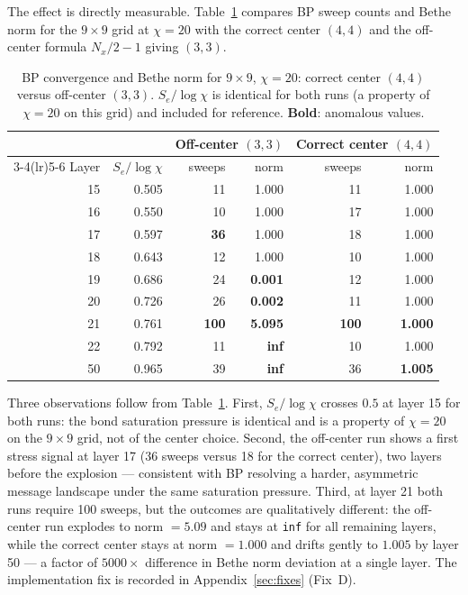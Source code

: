 The effect is directly measurable.
Table~\ref{tab:center_compare} compares BP sweep counts and Bethe norm
for the $9\times9$ grid at $\chi=20$ with the correct center $(4,4)$
and the off-center formula $N_x/2 - 1$ giving $(3,3)$.

\begin{table}[ht]
\centering
\caption{BP convergence and Bethe norm for $9\times9$, $\chi=20$: correct
  center $(4,4)$ versus off-center $(3,3)$.
  $S_e/\log\chi$ is identical for both runs (a property of $\chi=20$ on
  this grid) and included for reference.
  \textbf{Bold}: anomalous values.}
\label{tab:center_compare}
\small
\begin{tabular}{r r rr rr}
\toprule
 & & \multicolumn{2}{c}{Off-center $(3,3)$} & \multicolumn{2}{c}{Correct center $(4,4)$} \\
\cmidrule(lr){3-4}\cmidrule(lr){5-6}
Layer & $S_e/\log\chi$ & sweeps & norm & sweeps & norm \\
\midrule
15 & 0.505 & 11    & 1.000 & 11    & 1.000 \\
16 & 0.550 & 10    & 1.000 & 17    & 1.000 \\
17 & 0.597 & \textbf{36} & 1.000 & 18 & 1.000 \\
18 & 0.643 & 12    & 1.000 & 10    & 1.000 \\
19 & 0.686 & 24    & \textbf{0.001} & 12 & 1.000 \\
20 & 0.726 & 26    & \textbf{0.002} & 11 & 1.000 \\
21 & 0.761 & \textbf{100} & \textbf{5.095} & \textbf{100} & \textbf{1.000} \\
22 & 0.792 & 11    & \textbf{inf}   & 10  & 1.000 \\
50 & 0.965 & 39    & \textbf{inf}   & 36  & \textbf{1.005} \\
\bottomrule
\end{tabular}
\end{table}

Three observations follow from Table~\ref{tab:center_compare}.
First, $S_e/\log\chi$ crosses $0.5$ at layer 15 for both runs: the bond
saturation pressure is identical and is a property of $\chi=20$ on the
$9\times9$ grid, not of the center choice.
Second, the off-center run shows a first stress signal at layer 17
(36 sweeps versus 18 for the correct center), two layers before the
explosion — consistent with BP resolving a harder, asymmetric message
landscape under the same saturation pressure.
Third, at layer 21 both runs require 100 sweeps, but the outcomes are
qualitatively different: the off-center run explodes to norm $= 5.09$
and stays at \texttt{inf} for all remaining layers, while the correct
center stays at norm $= 1.000$ and drifts gently to $1.005$ by layer 50
--- a factor of $5000\times$ difference in Bethe norm deviation at a
single layer.
The implementation fix is recorded in Appendix~\ref{sec:fixes} (Fix~D).

